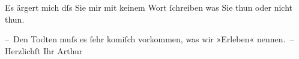 \pstart
           Es ärgert mich dſs Sie mir mit keinem Wort ſchreiben was Sie thun oder nicht
               thun.\pend
           
\pstart
           – Den Todten muſs es ſehr komiſch vorkommen, was wir »Erleben« nennen. – \pend
           \pstart Herzlichſt Ihr \spacefill\mbox{Arthur}\pend{}\endnumbering{}  
      